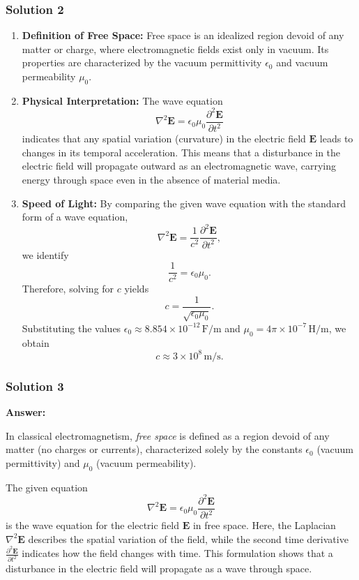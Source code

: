 \documentclass{article}
\begin{document}
\subsubsection{Solution 2}

\begin{enumerate}
    \item \textbf{Definition of Free Space:} Free space is an idealized region devoid of any matter or charge, where electromagnetic fields exist only in vacuum. Its properties are characterized by the vacuum permittivity $\epsilon_0$ and vacuum permeability $\mu_0$.
    
    \item \textbf{Physical Interpretation:} The wave equation
    \[
    \nabla^2 \mathbf{E} = \epsilon_0 \mu_0 \frac{\partial^2 \mathbf{E}}{\partial t^2}
    \]
    indicates that any spatial variation (curvature) in the electric field $\mathbf{E}$ leads to changes in its temporal acceleration. This means that a disturbance in the electric field will propagate outward as an electromagnetic wave, carrying energy through space even in the absence of material media.
    
    \item \textbf{Speed of Light:} By comparing the given wave equation with the standard form of a wave equation,
    \[
    \nabla^2 \mathbf{E} = \frac{1}{c^2}\frac{\partial^2 \mathbf{E}}{\partial t^2},
    \]
    we identify
    \[
    \frac{1}{c^2} = \epsilon_0 \mu_0.
    \]
    Therefore, solving for $c$ yields
    \[
    c = \frac{1}{\sqrt{\epsilon_0 \mu_0}}.
    \]
    Substituting the values $\epsilon_0 \approx 8.854 \times 10^{-12}\,\mathrm{F/m}$ and $\mu_0 = 4\pi \times 10^{-7}\,\mathrm{H/m}$, we obtain
    \[
    c \approx 3 \times 10^8 \,\mathrm{m/s}.
    \]
\end{enumerate}

\subsubsection{Solution 3}
\textbf{Answer:} 

In classical electromagnetism, \emph{free space} is defined as a region devoid of any matter (no charges or currents), characterized solely by the constants \(\epsilon_0\) (vacuum permittivity) and \(\mu_0\) (vacuum permeability). 

The given equation 
\[
\nabla^2 \mathbf{E} = \epsilon_0 \mu_0 \frac{\partial^2 \mathbf{E}}{\partial t^2}
\]
is the wave equation for the electric field \(\mathbf{E}\) in free space. Here, the Laplacian \(\nabla^2 \mathbf{E}\) describes the spatial variation of the field, while the second time derivative \(\frac{\partial^2 \mathbf{E}}{\partial t^2}\) indicates how the field changes with time. This formulation shows that a disturbance in the electric field will propagate as a wave through space.
\end{document}
